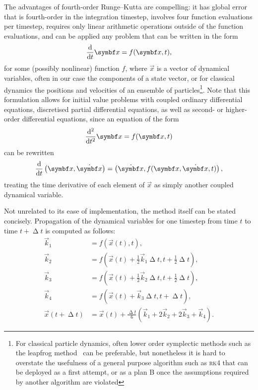 The advantages of fourth-order Runge--Kutta are compelling: it has global error that is fourth-order in the integration timestep, involves four function evaluations per timestep, requires only linear arithmetic operations outside of the function evaluations, and can be applied any problem that can be written in the form
\begin{align}
\dv t \vec x = f(\vec x, t),
\end{align}
for some (possibly nonlinear) function $f$, where $\vec{x}$ is a vector of dynamical variables, often in our case the components of a state vector, or for classical dynamics the positions and velocities of an ensemble of particles\footnote{For classical particle dynamics, often lower order symplectic methods such as the leapfrog method~\cite{Skeel97afamily} can be preferable, but nonetheless it is hard to overstate the usefulness of a general purpose algorithm such as \textsc{rk4} that can be deployed as a first attempt, or as a plan B once the assumptions required by another algorithm are violated}. Note that this formulation allows for initial value problems with coupled ordinary differential equations, discretised partial differential equations, as well as second- or higher-order differential equations, since an equation of the form
\begin{align}
\dv[2] t \vec x = f(\vec x, t)
\end{align}
can be rewritten
\begin{align}
\dv t \left(\vec x, \dot{\vec x}\right) = \left(\dot{\vec x}, f(\vec x, \dot{\vec x}, t)\right),
\end{align}
treating the time derivative of each element of $\vec x$ as simply another coupled dynamical variable.

Not unrelated to its ease of implementation, the method itself can be stated concisely. Propagation of the dynamical variables for one timestep from time $t$ to time $t + \upDelta t$ is computed as follows:
\begin{align}
\vec k_1 &= f(\vec x(t), t),\nonumber\\
\vec k_2 &= f(\vec x(t) + \tfrac12 \vec k_1\upDelta t, t + \tfrac12\upDelta t),\nonumber\\
\vec k_3 &= f(\vec x(t) + \tfrac12 \vec k_2\upDelta t, t + \tfrac12\upDelta t),\nonumber\\
\vec k_4 &= f(\vec x(t) + \vec k_3\upDelta t, t + \upDelta t),\nonumber\\
\vec x(t + \upDelta t) &= \vec x(t)
+ \tfrac{\upDelta t}6(\vec k_1 + 2\vec k_2 + 2\vec k_3 + \vec k_4).\label{eq:rk4}
\end{align}


